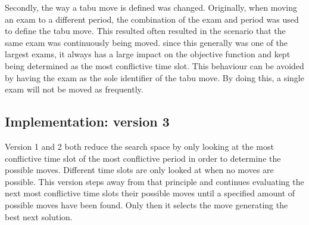 Secondly, the way a tabu move is defined was changed. Originally, when moving an exam to a different period, the combination of the exam and period was used to define the tabu move. This resulted often resulted in the scenario that the same exam was continuously being moved. since this generally was one of the largest exams, it always has a large impact on the objective function and kept being determined as the most conflictive time slot. This behaviour can be avoided by having the exam as the sole identifier of the tabu move. By doing this, a single exam will not be moved as frequently.

\subsection{Implementation: version 3}

Version 1 and 2 both reduce the search space by only looking at the most conflictive time slot of the most conflictive period in order to determine the possible moves. Different time slots are only looked at when no moves are possible. This version steps away from that principle and continues evaluating the next most conflictive time slots their possible moves until a specified amount of possible moves have been found. Only then it selects the move generating the best next solution.



